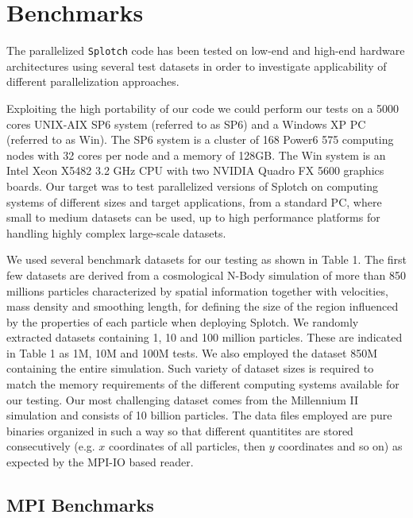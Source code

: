 \section{Benchmarks}

The parallelized {\tt Splotch} code has been tested on low-end and high-end hardware 
architectures using several test datasets in order to investigate applicability of 
different parallelization approaches.

Exploiting the high portability of our code we could perform our tests on a 
5000 cores UNIX-AIX  SP6 system (referred to as SP6) and a Windows XP PC (referred to as Win). 
The SP6 system is a cluster of 168 Power6 575 computing nodes with 32 cores per node 
and a memory of 128GB. The Win system is an Intel Xeon X5482 3.2 GHz CPU with 
two NVIDIA Quadro FX 5600 graphics boards. Our target was to test parallelized 
versions of Splotch on computing systems of different sizes and target applications, 
from a standard PC, where small to medium datasets can be used, up to high 
performance platforms for handling highly complex large-scale datasets.

We used several benchmark datasets for our testing as shown in Table 1. The first 
few datasets are derived from a cosmological N-Body simulation of more than 850 millions 
particles characterized by spatial information together with velocities, mass density 
and smoothing length, for defining the size of the region influenced by the properties 
of each particle when deploying Splotch. We randomly extracted datasets containing 
1, 10 and 100 million particles. These are indicated in Table 1 as 1M, 
10M and 100M tests. We also employed the dataset 850M containing the entire simulation. 
Such variety of dataset sizes is required to match the memory requirements of 
the different computing systems available for our testing.  
Our most challenging dataset comes from the Millennium II simulation \cite{2009MNRAS.398.1150B} 
and consists of 10 billion particles. The data files employed are pure binaries organized in such a way so that different 
quantitites are stored consecutively (e.g. $x$ coordinates of all particles, then $y$ coordinates and so on) as expected by the MPI-IO based reader. 

\subsection{MPI Benchmarks}

